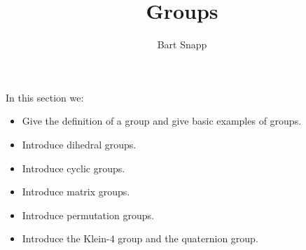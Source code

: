 \documentclass{ximera}
\author{Bart Snapp}
\title{Groups}
\begin{document}
\begin{abstract}
\end{abstract}
\maketitle
In this section we:

\begin{itemize}
\item Give the definition of a group and give basic examples of
  groups.
\item Introduce dihedral groups.
\item Introduce cyclic groups.
\item Introduce matrix groups.
\item Introduce permutation groups.
\item Introduce the Klein-$4$ group and the quaternion group.
\end{itemize}
\end{document}
